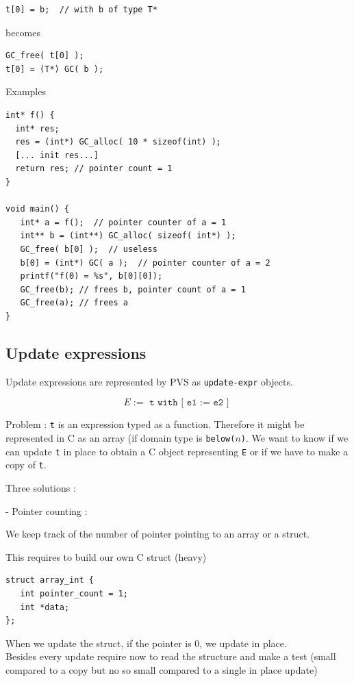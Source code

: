 \documentclass[12pt,a4paper,titlepage]{article}
\newcommand{\codeline}[1]{\texttt{#1}}
\begin{document}
\begin{lstlisting}
t[0] = b;  // with b of type T*
\end{lstlisting}
becomes
\begin{lstlisting}
GC_free( t[0] );
t[0] = (T*) GC( b );
\end{lstlisting}

Examples

\begin{lstlisting}
int* f() {
  int* res;
  res = (int*) GC_alloc( 10 * sizeof(int) );
  [... init res...]
  return res; // pointer count = 1
}

void main() {
   int* a = f();  // pointer counter of a = 1
   int** b = (int**) GC_alloc( sizeof( int*) );
   GC_free( b[0] );  // useless
   b[0] = (int*) GC( a );  // pointer counter of a = 2
   printf("f(0) = %s", b[0][0]);
   GC_free(b); // frees b, pointer count of a = 1
   GC_free(a); // frees a
}
\end{lstlisting}



\subsection{ Update expressions }
Update expressions are represented by PVS as \texttt{update-expr} objects.

$$ E := \texttt{ t with [ e1 := e2 ] } $$


Problem :
\codeline{t} is an expression typed as a function. Therefore it might be represented in C as an array (if domain type is \codeline{below($n$)}.
We want to know if we can update \codeline{t} in place to obtain a C object representing \codeline{E} or if we have to make a copy of \codeline{t}.

Three solutions :

- Pointer counting :

We keep track of the number of pointer pointing to an array or a struct.

This requires to build our own C struct (heavy)
\begin{lstlisting}
struct array_int {
   int pointer_count = 1;
   int *data;
};
\end{lstlisting}

When we update the struct, if the pointer is 0, we update in place.\\

Besides every update require now to read the structure and make a test (small compared to a copy but no so small compared to a single in place update)\\
\end{document}
